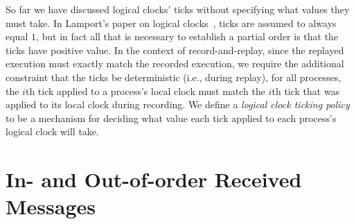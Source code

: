 So far we have discussed logical clocks' ticks without specifying what
values they must take. In Lamport's paper on logical
clocks~\cite{LogicalClocks:Lamport:1978}, ticks are assumed to always
equal $1$, but in fact all that is necessary to establish a partial
order is that the ticks have positive value. In the context of
record-and-replay, since the replayed execution must exactly match the
recorded execution, we require the additional constraint that the
ticks be deterministic (i.e., during replay), for all processes, the
$i$th tick applied to a process's local clock must match the $i$th
tick that was applied to its local clock during recording. We define a
\textit{logical clock ticking policy} to be a mechanism for deciding
what value each tick applied to each process's logical clock will
take.

\section{In- and Out-of-order Received Messages}

